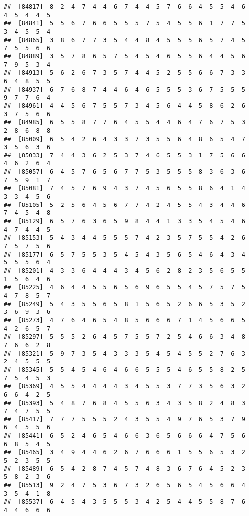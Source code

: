 \documentclass[
]{book}
\begin{document}
\begin{verbatim}
##  [84817]  8  2  4  7  4  4  6  7  4  4  5  7  6  6  4  5  5  4  6  4  5  4  4  5
##  [84841]  5  5  6  7  6  6  5  5  5  7  5  4  5  5  6  1  7  7  5  3  4  5  5  4
##  [84865]  3  8  6  7  7  3  5  4  4  8  4  5  5  5  6  5  7  4  5  7  5  5  6  6
##  [84889]  3  5  7  8  6  5  7  5  4  5  4  6  5  5  6  4  4  5  6  7  9  5  3  4
##  [84913]  5  6  2  6  7  3  5  7  4  4  5  2  5  5  6  6  7  3  3  6  4  8  5  5
##  [84937]  6  7  6  8  7  4  4  6  4  6  5  5  5  3  6  7  5  5  5  9  7  7  6  4
##  [84961]  4  4  5  6  7  5  5  7  3  4  5  6  4  4  5  8  6  2  6  3  7  5  6  6
##  [84985]  6  5  5  8  7  7  6  4  5  5  4  4  6  4  7  6  7  5  3  2  8  6  8  8
##  [85009]  6  5  4  2  6  4  3  3  7  3  5  5  6  4  8  6  5  4  7  3  5  6  3  6
##  [85033]  7  4  4  3  6  2  5  3  7  4  6  5  5  3  1  7  5  6  6  4  6  2  6  4
##  [85057]  6  4  5  7  6  5  6  7  7  5  3  5  5  5  8  3  6  3  6  7  5  9  1  7
##  [85081]  7  4  5  7  6  9  4  3  7  4  5  6  5  5  8  6  4  1  4  3  3  4  5  6
##  [85105]  5  2  5  6  4  5  6  7  7  4  2  4  5  5  4  3  4  4  6  7  4  5  4  8
##  [85129]  6  5  7  6  3  6  5  9  8  4  4  1  3  3  5  4  5  4  6  4  7  4  4  5
##  [85153]  5  4  3  4  4  5  5  5  7  4  2  3  5  7  5  5  4  2  6  7  5  7  5  6
##  [85177]  6  5  7  5  5  3  5  4  5  4  3  5  6  5  4  6  4  3  4  5  5  5  6  4
##  [85201]  4  3  3  6  4  4  4  3  4  5  6  2  8  2  3  5  6  5  5  1  5  6  4  6
##  [85225]  4  6  4  4  5  5  6  5  6  9  6  5  5  4  5  7  5  7  5  4  7  8  5  7
##  [85249]  5  4  3  5  5  6  5  8  1  5  6  5  2  6  6  5  3  5  2  3  6  9  3  6
##  [85273]  4  7  6  4  6  5  4  8  5  6  6  6  7  1  4  5  6  6  5  4  2  6  5  7
##  [85297]  5  5  5  2  6  4  5  7  5  5  7  2  5  4  6  6  3  4  8  7  6  6  2  8
##  [85321]  5  9  7  3  5  4  3  3  3  5  4  5  4  5  5  2  7  6  3  2  4  5  5  5
##  [85345]  5  5  4  5  4  6  4  6  6  5  5  5  4  6  5  5  8  2  5  7  5  4  5  3
##  [85369]  4  5  5  4  4  4  4  3  4  5  5  3  7  7  3  5  6  3  2  6  6  4  2  5
##  [85393]  5  4  8  7  6  8  4  5  5  6  3  4  3  5  8  2  4  8  3  7  4  7  5  5
##  [85417]  7  7  7  5  5  5  2  4  3  5  5  4  9  7  6  5  3  7  9  6  4  5  5  6
##  [85441]  6  5  2  4  6  5  4  6  6  3  6  5  6  6  6  4  7  5  6  6  8  5  4  5
##  [85465]  3  4  9  4  4  6  2  6  7  6  6  6  1  5  5  6  5  3  2  5  2  3  5  5
##  [85489]  6  5  4  2  8  7  4  5  7  4  8  3  6  7  6  4  5  2  3  5  8  2  3  6
##  [85513]  9  2  4  7  5  3  6  7  3  2  6  5  6  5  4  5  6  6  4  3  5  4  1  8
##  [85537]  6  4  5  4  3  5  5  5  3  4  2  5  4  4  5  5  8  7  6  4  4  6  6  6

\end{verbatim}
\end{document}

